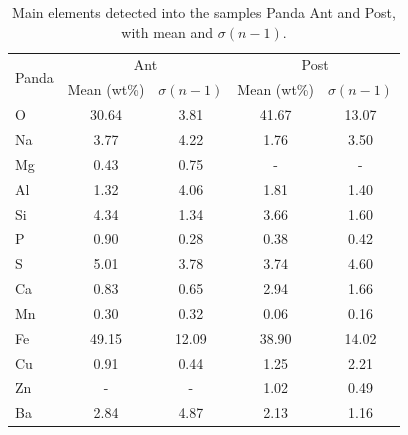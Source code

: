 \begin{table}[H]\centering
  \begin{tabular}{lcccc}
    \toprule
    \multirow{2}{*}[-0.5\dimexpr \aboverulesep + \belowrulesep + \cmidrulewidth]{Panda}
    & \multicolumn{2}{c}{Ant} & \multicolumn{2}{c}{Post} \\
    \cmidrule(l){2-3} \cmidrule(l){4-5}
    & Mean (wt\%) & $\sigma (n-1)$ & Mean (wt\%) & $\sigma (n-1)$ \\
    \midrule
    O & 30.64 & 3.81 & 41.67 & 13.07 \\
    Na & 3.77 & 4.22 & 1.76 & 3.50 \\
    Mg & 0.43 & 0.75 & - & - \\
    Al & 1.32 & 4.06 & 1.81 & 1.40 \\
    Si & 4.34 & 1.34 & 3.66 & 1.60 \\
    P & 0.90 & 0.28 & 0.38 & 0.42 \\
    S & 5.01 & 3.78 & 3.74 & 4.60 \\
    Ca & 0.83 & 0.65 & 2.94 & 1.66 \\
    Mn & 0.30 & 0.32 & 0.06 & 0.16 \\
    Fe & 49.15 & 12.09 & 38.90 & 14.02 \\
    Cu & 0.91 & 0.44 & 1.25 & 2.21 \\
    Zn & - & - & 1.02 & 0.49 \\
    Ba & 2.84 & 4.87 & 2.13 & 1.16 \\
    \bottomrule
  \end{tabular}
    \caption{Main elements detected into the samples Panda Ant and Post, with mean and $\sigma (n-1)$.}
    \label{fig:Elements_Panda}
\end{table}

